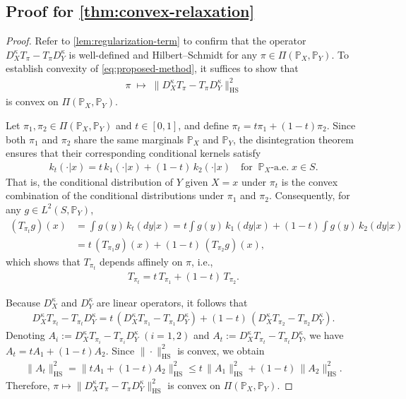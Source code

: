 \documentclass{article}
\begin{document}
\subsection{Proof for \cref{thm:convex-relaxation}}\label{pf:thm:convex-relaxation}
\begin{proof}
	Refer to \cref{lem:regularization-term} to confirm that the operator $D_X^{\kappa}T_{\pi} - T_{\pi}D_Y^{\kappa}$ is well-defined and Hilbert--Schmidt for any $\pi \in \Pi(\mathbb{P}_X,\mathbb{P}_Y)$. 
	To establish convexity of \eqref{eq:proposed-method}, it suffices to show that 
	\begin{align*}
	\pi \;\mapsto\; \|D_X^{\kappa}T_\pi - T_\pi D_Y^{\kappa}\|_{\mathrm{HS}}^2
	\end{align*}
	is convex on $\Pi(\mathbb{P}_X,\mathbb{P}_Y)$.
	
	Let $\pi_1,\pi_2 \in \Pi(\mathbb{P}_X,\mathbb{P}_Y)$ and $t \in [0,1]$, and define $\pi_t = t\pi_1 + (1-t)\pi_2$. 
	Since both $\pi_1$ and $\pi_2$ share the same marginals $\mathbb{P}_X$ and $\mathbb{P}_Y$, 
	the disintegration theorem ensures that their corresponding conditional kernels satisfy
	\begin{align*}
	k_t(\cdot|x) = t\,k_1(\cdot|x) + (1-t)\,k_2(\cdot|x)
	\quad \text{for} \;\; \mathbb{P}_X\text{-a.e.} \; x \in S.
	\end{align*}
	That is, the conditional distribution of $Y$ given $X=x$ under $\pi_t$ is the convex combination of the conditional distributions under $\pi_1$ and $\pi_2$. 
	Consequently, for any $g \in L^2(S,\mathbb{P}_Y)$,
	\begin{align*}
		(T_{\pi_t} g)(x)
		&= \int g(y)\,k_t(dy|x)
		= t \int g(y)\,k_1(dy|x) + (1-t)\int g(y)\,k_2(dy|x) \\
		&= t\,(T_{\pi_1}g)(x) + (1-t)\,(T_{\pi_2}g)(x),
	\end{align*}
	which shows that $T_{\pi_t}$ depends affinely on $\pi$, i.e.,
	\begin{align*}
	T_{\pi_t} = t\,T_{\pi_1} + (1-t)\,T_{\pi_2}.
	\end{align*}
	
	Because $D_X^{\kappa}$ and $D_Y^{\kappa}$ are linear operators, it follows that
	\begin{align*}
	D_X^{\kappa}T_{\pi_t} - T_{\pi_t}D_Y^{\kappa}
	= t\,(D_X^{\kappa}T_{\pi_1} - T_{\pi_1}D_Y^{\kappa})
	+ (1-t)\,(D_X^{\kappa}T_{\pi_2} - T_{\pi_2}D_Y^{\kappa}).
	\end{align*}
	Denoting $A_i := D_X^{\kappa}T_{\pi_i} - T_{\pi_i}D_Y^{\kappa}$ $(i=1,2)$ and $A_t := D_X^{\kappa}T_{\pi_t} - T_{\pi_t}D_Y^{\kappa}$, 
	we have $A_t = tA_1 + (1-t)A_2$. 
	Since $\|\cdot\|_{\mathrm{HS}}^2$ is convex, we obtain
	\begin{align*}
	\|A_t\|_{\mathrm{HS}}^2
	= \|tA_1 + (1-t)A_2\|_{\mathrm{HS}}^2
	\le t\,\|A_1\|_{\mathrm{HS}}^2 + (1-t)\,\|A_2\|_{\mathrm{HS}}^2.
	\end{align*}
	Therefore, $\pi \mapsto \|D_X^{\kappa}T_\pi - T_\pi D_Y^{\kappa}\|_{\mathrm{HS}}^2$ is convex on $\Pi(\mathbb{P}_X,\mathbb{P}_Y)$. 
\end{proof}
\end{document}
